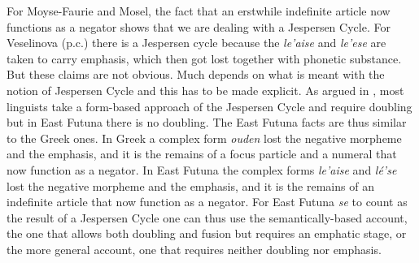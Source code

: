 ﻿\documentclass[output=paper]{langsci/langscibook}
\begin{document}
%
For Moyse-Faurie and Mosel, the fact that an erstwhile indefinite article
now functions as a negator shows that we are dealing with a Jespersen
Cycle. For Veselinova (p.c.) there is a Jespersen cycle because the
\textit{le'aise} and \textit{le'ese} are taken to carry emphasis, which
then got lost together with phonetic substance. But these claims are not
obvious. Much depends on what is meant with the notion of Jespersen Cycle
and this has to be made explicit. As argued in , most
linguists take a form-based approach of the Jespersen Cycle and require
doubling but in East Futuna there is no doubling. The East
Futuna facts are thus similar to the Greek ones. In Greek a
complex form \textit{ouden} lost the negative
morpheme and the emphasis, and it is the remains of a focus particle and a
numeral that now function as a negator. In East Futuna the complex forms
\textit{le'aise} and \textit{lé'se} lost the negative morpheme and the
emphasis, and it is the remains of an indefinite article that now function
as a negator. For East Futuna \textit{se} to count as the result of a
Jespersen Cycle one can thus use the semantically-based account, the one
that allows both doubling and fusion but requires an emphatic stage, or the
more general account, one that requires neither doubling nor emphasis. 
\end{document}
